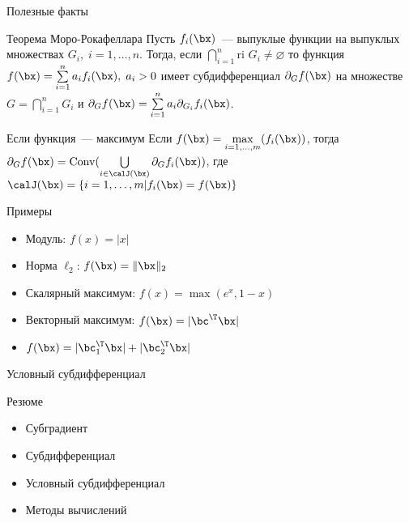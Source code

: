 \documentclass[12pt,russian]{beamer}
\begin{document}
\begin{frame}{Полезные факты}
\begin{block}{Теорема Моро-Рокафеллара}
Пусть $f_i(\bx)$~--- выпуклые функции на выпуклых множествах $G_i, \; i = 1,\ldots,n$. 
Тогда, если $\bigcap\limits_{i=1}^n \text{ri } G_i \neq \varnothing$ то функция $f(\bx) = \sum\limits_{i=1}^n a_i f_i(\bx), \; a_i > 0$ имеет субдифференциал $\partial_G f(\bx)$ на множестве $G = \bigcap\limits_{i=1}^n G_i$ и $\partial_G f(\bx) = \sum\limits_{i=1}^n a_i \partial_{G_i} f_i(\bx)$. 
\end{block}

\begin{block}{Если функция~--- максимум}
Если $f(\bx) = \max\limits_{i=1,\ldots,m}(f_i(\bx))$, тогда $\partial_G f(\bx) = \text{Conv} (\bigcup\limits_{i \in \calJ(\bx)} \partial_G f_i(\bx))$, где $\calJ(\bx) = \{ i = 1,\ldots, m | f_i(\bx) = f(\bx) \}$
\end{block}
\end{frame}

\begin{frame}{Примеры}
\begin{itemize}
\item Модуль: $f(x) = |x|$
\item Норма $\ell_2$: $f(\bx) = \| \bx \|_2$
\item Скалярный максимум: $f(x) = \max(e^x, 1 - x)$
\item Векторный максимум: $f(\bx) = |\bc^{\T}\bx|$
\item $f(\bx) = |\bc^{\T}_1\bx| + |\bc^{\T}_2\bx|$
\end{itemize}
\end{frame}

\begin{frame}{Условный субдифференциал}

\end{frame}

\begin{frame}{Резюме}
\begin{itemize}
\item Субградиент
\item Субдифференциал
\item Условный субдифференциал
\item Методы вычислений
\end{itemize}
\end{frame}
\end{document}
